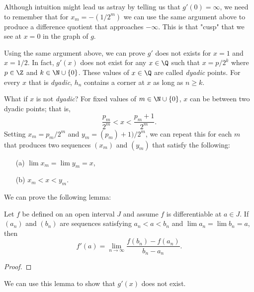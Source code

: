 Although intuition might lead us astray by telling us that \( g'(0) = \infty  \), we need to remember that for \( x_m = -(1/2^m) \) we can use the same argument above to produce a difference quotient that approaches \( - \infty  \). This is that "cusp" that we see at \( x = 0  \) in the graph of \( g  \). 

Using the same argument above, we can prove \( g' \) does not exists for \( x = 1  \) and \( x = 1 / 2 \). In fact, \( g'(x)  \) does not exist for any \( x \in \Q  \) such that \( x = p/2^k \) where \( p \in \Z  \) and \( k \in \N \cup \{ 0 \}  \). These values of \( x \in \Q  \) are called \textit{dyadic} points. For every \( x  \) that is \textit{dyadic}, \( h_n  \) contains a corner at \( x  \) as long as \( n \geq k  \). 

What if \( x  \) is not \textit{dyadic}? For fixed values of \( m \in \N \cup \{ 0  \}  \), \( x  \) can be between two dyadic points; that is, 
\[  \frac{ p_m  }{ 2^m } < x < \frac{ p_m + 1  }{ 2^m }. \] Setting \( x_m = p_m / 2^m \) and \( y_m = (p_m) + 1) / 2^m  \), we can repeat this for each \( m  \) that produces two sequences \( (x_m)  \) and \( (y_m)  \) that satisfy the following:
\begin{enumerate}
    \item[(a)] \( \lim x_m = \lim y_m = x   \), 
    \item[(b)] \( x_m < x < y_m \).
\end{enumerate}

We can prove the following lemma:

\begin{tcolorbox}
\begin{lem}
Let \( f  \) be defined on an open interval \( J  \) and assume \( f  \) is differentiable at \( a \in J  \). If \( (a_n)  \) and \( (b_n)  \) are sequences satisfying \( a_n < a < b_n  \) and \( \lim a_n = \lim b_n = a  \), then 
\[ f'(a) = \lim_{ n \to \infty  } \frac{ f(b_n) - f(a_n)  }{ b_n - a_n  }. \]
\end{lem}
\end{tcolorbox}
\begin{proof}

\end{proof}
We can use this lemma to show that \( g'(x)  \) does not exist.




